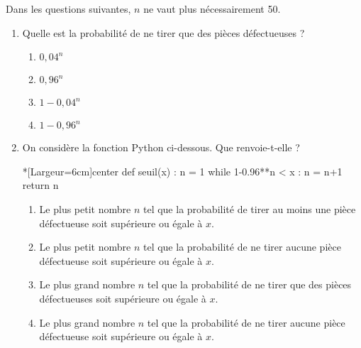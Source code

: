 Dans les questions suivantes, $n$ ne vaut plus nécessairement 50.

\begin{enumerate}[resume]
	\item Quelle est la probabilité de ne tirer que des pièces défectueuses ?
	\begin{enumerate}
		\item $0,04^n$
		\item $0,96^n$
		\item $1-0,04^n$
		\item $1-0,96^n$
	\end{enumerate}
	\item On considère la fonction \textsf{Python} ci-dessous. Que renvoie-t-elle ?
	
\begin{CodePythonLstAlt}*[Largeur=6cm]{center}
def seuil(x) :
	n = 1
	while 1-0.96**n < x :
		n = n+1
	return n
\end{CodePythonLstAlt}
	\begin{enumerate}
		\item Le plus petit nombre $n$ tel que la probabilité de tirer au moins une pièce défectueuse soit supérieure ou égale à $x$.
		\item Le plus petit nombre $n$ tel que la probabilité de ne tirer aucune pièce défectueuse soit supérieure ou égale à $x$.
		\item Le plus grand nombre $n$ tel que la probabilité de ne tirer que des pièces défectueuses soit supérieure ou égale à $x$.
		\item Le plus grand nombre $n$ tel que la probabilité de ne tirer aucune pièce défectueuse soit supérieure ou égale à $x$.
	\end{enumerate}
\end{enumerate}